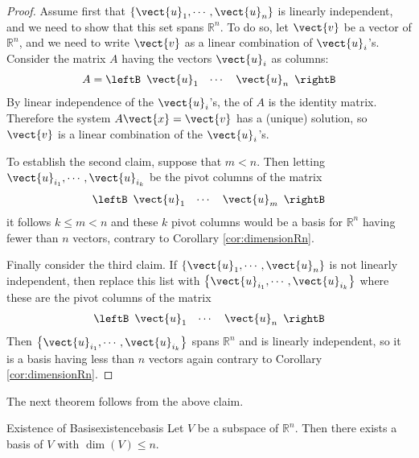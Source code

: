 \begin{proof}
Assume first that $\left\{ \vect{u}_{1},\cdots ,\vect{u}_{n}\right\} $
is linearly independent, and we need to show that this set spans
$\mathbb{R}^{n}$. To do so, let $\vect{v}$ be a vector of
$\mathbb{R}^{n}$, and we need to write $\vect{v}$ as a linear combination of $\vect{u}_i$'s. 
Consider the matrix $A$ having the vectors $\vect{u}_i$  as
columns:
\begin{equation*}
A = 
\leftB
\begin{array}{rrr}
\vect{u}_{1} & \cdots & \vect{u}_{n} 
\end{array}
\rightB
\end{equation*}
By linear independence of the $\vect{u}_i$'s, the \rref \;of $A$ is
the identity matrix.  Therefore the system $A\vect{x}=
\vect{v}$ has a (unique) solution, so $\vect{v}$ is a linear combination
of the $\vect{u}_i$'s.

To establish the second claim, suppose that $m<n.$ Then letting
$\vect{u}_{i_{1}},\cdots ,\vect{u}_{i_{k}}$ be the pivot columns of the
matrix
\begin{equation*}
\leftB
\begin{array}{ccc}
\vect{u}_{1} & \cdots & \vect{u}_{m}
\end{array}
\rightB
\end{equation*}
it follows $k\leq m<n$ and these $k$ pivot columns would be a basis
for $\mathbb{R}^{n}$ having fewer than $n$ vectors, contrary to
Corollary \ref{cor:dimensionRn}.

Finally consider the third claim. If $\left\{ \vect{u}_{1},\cdots
,\vect{u}_{n}\right\} $ is not linearly independent, then replace this
list with $\left\{ \vect{u}_{i_{1}},\cdots ,\vect{u}_{i_{k}}\right\} $ where these
are the pivot columns of the matrix 
\begin{equation*}
\leftB
\begin{array}{ccc}
\vect{u}_{1} & \cdots & \vect{u}_{n}
\end{array}
\rightB
\end{equation*}
Then $\left\{ \vect{u}_{i_{1}},\cdots ,\vect{u}_{i_{k}}\right\} $ spans
$\mathbb{R}^{n}$ and is linearly independent, so it is a basis having
less than $n$ vectors again contrary to Corollary \ref{cor:dimensionRn}.
\end{proof}

The next theorem follows from the above claim.

\begin{theorem}{Existence of Basis}{existencebasis}
Let $V$ be a subspace of $\mathbb{R}^n$. Then there exists a basis of $V$ with 
 $\dim(V)\leq n$.
\end{theorem}

